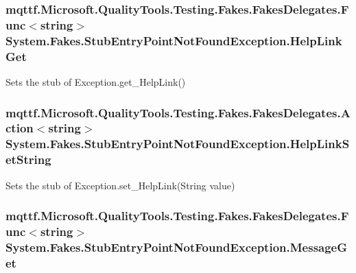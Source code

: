 \hypertarget{class_system_1_1_fakes_1_1_stub_entry_point_not_found_exception_a9b9f38bccb53497db9b8c2288bbc71d4}{
\subsubsection[{Help\-Link\-Get}]{\setlength{\rightskip}{0pt plus 5cm}mqttf.\-Microsoft.\-Quality\-Tools.\-Testing.\-Fakes.\-Fakes\-Delegates.\-Func$<$string$>$ System.\-Fakes.\-Stub\-Entry\-Point\-Not\-Found\-Exception.\-Help\-Link\-Get}}\label{class_system_1_1_fakes_1_1_stub_entry_point_not_found_exception_a9b9f38bccb53497db9b8c2288bbc71d4}


Sets the stub of Exception.\-get\-\_\-\-Help\-Link()

\hypertarget{class_system_1_1_fakes_1_1_stub_entry_point_not_found_exception_a212ac7f077d2360f888c2a0869d8792d}{
\subsubsection[{Help\-Link\-Set\-String}]{\setlength{\rightskip}{0pt plus 5cm}mqttf.\-Microsoft.\-Quality\-Tools.\-Testing.\-Fakes.\-Fakes\-Delegates.\-Action$<$string$>$ System.\-Fakes.\-Stub\-Entry\-Point\-Not\-Found\-Exception.\-Help\-Link\-Set\-String}}\label{class_system_1_1_fakes_1_1_stub_entry_point_not_found_exception_a212ac7f077d2360f888c2a0869d8792d}


Sets the stub of Exception.\-set\-\_\-\-Help\-Link(\-String value)

\hypertarget{class_system_1_1_fakes_1_1_stub_entry_point_not_found_exception_abe976e88b600f879c425546b20631458}{
\subsubsection[{Message\-Get}]{\setlength{\rightskip}{0pt plus 5cm}mqttf.\-Microsoft.\-Quality\-Tools.\-Testing.\-Fakes.\-Fakes\-Delegates.\-Func$<$string$>$ System.\-Fakes.\-Stub\-Entry\-Point\-Not\-Found\-Exception.\-Message\-Get}}\label{class_system_1_1_fakes_1_1_stub_entry_point_not_found_exception_abe976e88b600f879c425546b20631458}


